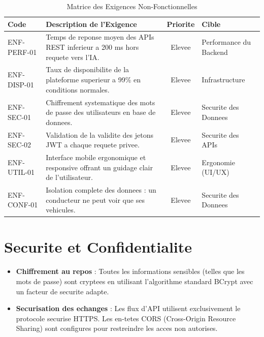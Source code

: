 \documentclass[11pt,a4paper]{report}
\begin{document}
\begin{table}[h!]
\centering
\caption{Matrice des Exigences Non-Fonctionnelles}
\label{tab:exigences_non_fonc}
\vspace{0.2cm}
\begin{tabular}{@{}l p{6cm} c p{6cm}@{}}
\toprule
\textbf{Code} & \textbf{Description de l'Exigence} & \textbf{Priorite} & \textbf{Cible} \\ \midrule
ENF-PERF-01 & Temps de reponse moyen des APIs REST inferieur a 200 ms hors requete vers l'IA. & Elevee & Performance du Backend \\
ENF-DISP-01 & Taux de disponibilite de la plateforme superieur a 99\% en conditions normales. & Elevee & Infrastructure \\
ENF-SEC-01 & Chiffrement systematique des mots de passe des utilisateurs en base de donnees. & Elevee & Securite des Donnees \\
ENF-SEC-02 & Validation de la validite des jetons JWT a chaque requete privee. & Elevee & Securite des APIs \\
ENF-UTIL-01 & Interface mobile ergonomique et responsive offrant un guidage clair de l'utilisateur. & Elevee & Ergonomie (UI/UX) \\
ENF-CONF-01 & Isolation complete des donnees : un conducteur ne peut voir que ses vehicules. & Elevee & Securite des Donnees \\
\bottomrule
\end{tabular}
\end{table}

\section{Securite et Confidentialite}
\begin{itemize}[label=\textbullet]
    \item \textbf{Chiffrement au repos} : Toutes les informations sensibles (telles que les mots de passe) sont cryptees en utilisant l'algorithme standard BCrypt avec un facteur de securite adapte.
    \item \textbf{Securisation des echanges} : Les flux d'API utilisent exclusivement le protocole securise HTTPS. Les en-tetes CORS (Cross-Origin Resource Sharing) sont configures pour restreindre les acces non autorises.
\end{itemize}

\end{document}
